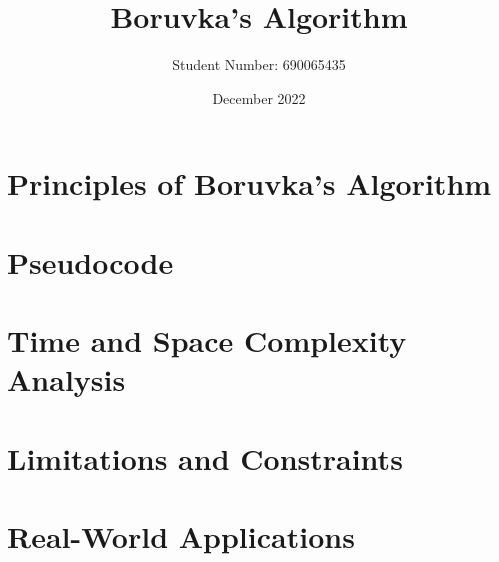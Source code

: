 \documentclass[a4paper, 11pt]{article}
\begin{document}
\title{Boruvka's Algorithm}
\author{Student Number: 690065435}
\date{December 2022}
\maketitle

\section{Principles of Boruvka's Algorithm}

\section{Pseudocode}

\section{Time and Space Complexity Analysis}

\section{Limitations and Constraints}

\section{Real-World Applications}



\end{document}
